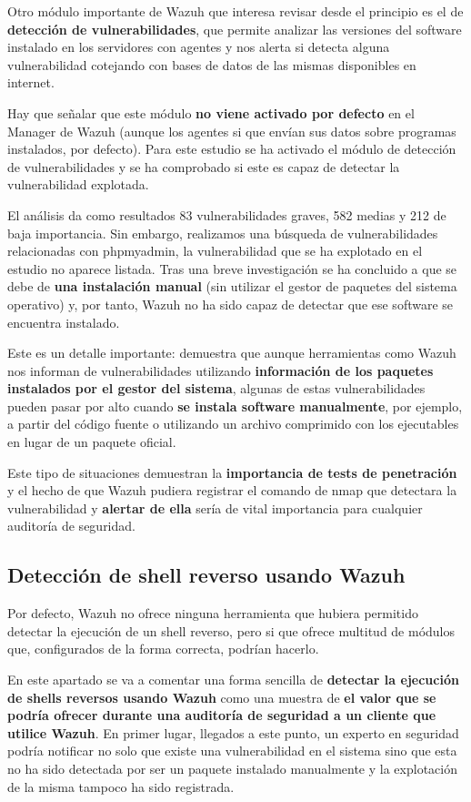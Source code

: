 Otro módulo importante de Wazuh que interesa revisar desde el principio es el de \textbf{detección de vulnerabilidades}, que permite analizar las versiones del software instalado en los servidores con agentes y nos alerta si detecta alguna vulnerabilidad cotejando con bases de datos de las mismas disponibles en internet.

Hay que señalar que este módulo \textbf{no viene activado por defecto} en el Manager de Wazuh (aunque los agentes si que envían sus datos sobre programas instalados, por defecto). Para este estudio se ha activado el módulo de detección de vulnerabilidades y se ha comprobado si este es capaz de detectar la vulnerabilidad explotada.

El análisis da como resultados 83 vulnerabilidades graves, 582 medias y 212 de baja importancia. Sin embargo, realizamos una búsqueda de vulnerabilidades relacionadas con phpmyadmin, la vulnerabilidad que se ha explotado en el estudio no aparece listada. Tras una breve investigación se ha concluido a que se debe de \textbf{una instalación manual} (sin utilizar el gestor de paquetes del sistema operativo) y, por tanto, Wazuh no ha sido capaz de detectar que ese software se encuentra instalado.

Este es un detalle importante: demuestra que aunque herramientas como Wazuh nos informan de vulnerabilidades utilizando \textbf{información de los paquetes instalados por el gestor del sistema}, algunas de estas vulnerabilidades pueden pasar por alto cuando \textbf{se instala software manualmente}, por ejemplo, a partir del código fuente o utilizando un archivo comprimido con los ejecutables en lugar de un paquete oficial. 

Este tipo de situaciones demuestran la \textbf{importancia de tests de penetración} y el hecho de que Wazuh pudiera registrar el comando de nmap que detectara la vulnerabilidad y \textbf{alertar de ella} sería de vital importancia para cualquier auditoría de seguridad.

\subsection{Detección de shell reverso usando Wazuh}

Por defecto, Wazuh no ofrece ninguna herramienta que hubiera permitido detectar la ejecución de un shell reverso, pero si que ofrece multitud de módulos que, configurados de la forma correcta, podrían hacerlo. 

En este apartado se va a comentar una forma sencilla de \textbf{detectar la ejecución de shells reversos usando Wazuh} como una muestra de \textbf{el valor que se podría ofrecer durante una auditoría de seguridad a un cliente que utilice Wazuh}. En primer lugar, llegados a este punto, un experto en seguridad podría notificar no solo que existe una vulnerabilidad en el sistema sino que esta no ha sido detectada por ser un paquete instalado manualmente y la explotación de la misma tampoco ha sido registrada.

